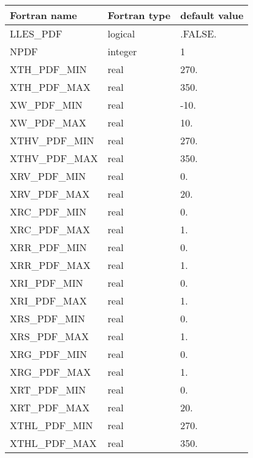 \begin{center}
\begin{tabular} {|l|l|l|}
\hline
Fortran name & Fortran type & default value \\
\hline
LLES\_PDF                     &  logical          & .FALSE.  \\
NPDF                          & integer           & 1 \\
XTH\_PDF\_MIN                 & real              & 270. \\
XTH\_PDF\_MAX                 & real              & 350. \\
XW\_PDF\_MIN                  & real              & -10. \\
XW\_PDF\_MAX                  & real              & 10. \\
XTHV\_PDF\_MIN                & real              & 270. \\
XTHV\_PDF\_MAX                & real              & 350. \\
XRV\_PDF\_MIN                 & real              & 0. \\
XRV\_PDF\_MAX                 & real              & 20. \\
XRC\_PDF\_MIN                 & real              & 0. \\
XRC\_PDF\_MAX                 & real              & 1. \\
XRR\_PDF\_MIN                 & real              & 0. \\
XRR\_PDF\_MAX                 & real              & 1. \\
XRI\_PDF\_MIN                 & real              & 0. \\
XRI\_PDF\_MAX                 & real              & 1. \\
XRS\_PDF\_MIN                 & real              & 0. \\
XRS\_PDF\_MAX                 & real              & 1. \\
XRG\_PDF\_MIN                 & real              & 0. \\
XRG\_PDF\_MAX                 & real              & 1. \\
XRT\_PDF\_MIN                 & real              & 0. \\
XRT\_PDF\_MAX                 & real              & 20. \\
XTHL\_PDF\_MIN                & real              & 270. \\
XTHL\_PDF\_MAX                & real              & 350. \\
\hline
\end{tabular}
\end{center}

